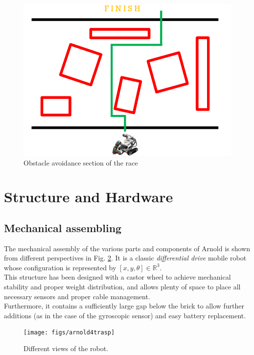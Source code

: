\documentclass[a4paper,11pt,oneside]{book}
\begin{document}
		\begin{figure}
			\centering
			\includegraphics[scale=0.55]{figs/obstacleArena}
			\caption{Obstacle avoidance section of the race}\label{fig:obstacleArena.png}
		\end{figure}
		
		
			\section{Structure and Hardware}
			\subsection {Mechanical assembling}
			
			The mechanical assembly of the various parts and components of Arnold is shown from different perspectives in Fig. \ref{fig:arnold4trasp.png}.
			It is a classic \textit{differential drive} mobile robot whose configuration is represented by $[x,y, \theta] \in \mathbb{R}^3$.\\
			
			This structure has been designed with a castor wheel to achieve mechanical stability and proper weight distribution, and allows plenty of space to place all necessary sensors and proper cable management.\\
			Furthermore, it contains a sufficiently large gap below the brick to allow further additions (as in the case of the gyroscopic sensor) and easy battery replacement.
			
			\begin{figure}
				\centering
				\texttt{[image: figs/arnold4trasp]}
				\caption{Different views of the robot.}\label{fig:arnold4trasp.png}
			\end{figure}
			
\end{document}
